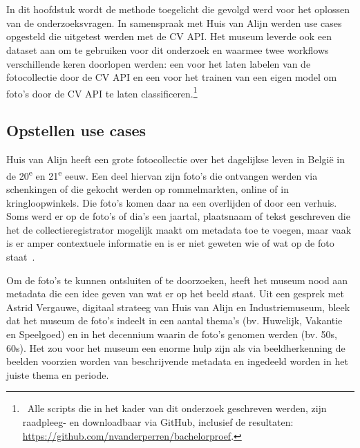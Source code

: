 
\chapter{}
\label{ch:methodologie}

In dit hoofdstuk wordt de methode toegelicht die gevolgd werd voor het oplossen van de onderzoeksvragen. In samenspraak met Huis van Alijn werden use cases opgesteld die uitgetest werden met de CV API. Het museum leverde ook een dataset aan om te gebruiken voor dit onderzoek en waarmee twee workflows verschillende keren doorlopen werden: een voor het laten labelen van de fotocollectie door de CV API en een voor het trainen van een eigen model om foto's door de CV API te laten classificeren.\footnote{~Alle scripts die in het kader van dit onderzoek geschreven werden, zijn raadpleeg- en downloadbaar via GitHub, inclusief de resultaten: \url{https://github.com/nvanderperren/bachelorproef}.}

\section{Opstellen use cases}
\label{sec:opstellen-use-cases}

Huis van Alijn heeft een grote fotocollectie over het dagelijkse leven in Belgi\"{e} in de 20\textsuperscript{e} en 21\textsuperscript{e} eeuw. Een deel hiervan zijn foto’s die ontvangen werden via schenkingen of die gekocht werden op rommelmarkten, online of in kringloopwinkels. Die foto's komen daar na een overlijden of door een verhuis. Soms werd er op de foto's of dia's een jaartal, plaatsnaam of tekst geschreven die het de collectieregistrator mogelijk maakt om metadata toe te voegen, maar vaak is er amper contextuele informatie en is er niet geweten wie of wat op de foto staat~\autocite{Heemkunde}. 

Om de foto’s te kunnen ontsluiten of te doorzoeken, heeft het museum nood aan metadata die een idee geven van wat er op het beeld staat. Uit een gesprek met Astrid Vergauwe, digitaal strateeg van Huis van Alijn en Industriemuseum, bleek dat het museum de foto’s indeelt in een aantal thema’s (bv. Huwelijk, Vakantie en Speelgoed) en in het decennium waarin de foto’s genomen werden (bv. 50s, 60s). Het zou voor het museum een enorme hulp zijn als via beeldherkenning de beelden voorzien worden van beschrijvende metadata en ingedeeld worden in het juiste thema en periode.

